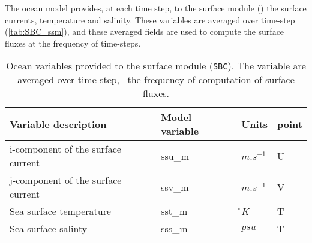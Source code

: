 \documentclass[../main/NEMO_manual]{subfiles}
\begin{document}

The ocean model provides, at each time step, to the surface module ()
the surface currents, temperature and salinity.
These variables are averaged over  time-step (\autoref{tab:SBC_ssm}), and
these averaged fields are used to compute the surface fluxes at the frequency of  time-steps.

\begin{table}[tb]
  \centering
  \begin{tabular}{|l|l|l|l|}
    \hline
    Variable description			                  & Model variable	& Units	& point                 \\
    \hline
    i-component of the surface current	& ssu\_m	              & $m.s^{-1}$	    & U     \\
    \hline
    j-component of the surface current	& ssv\_m	              & $m.s^{-1}$	    & V     \\
    \hline
    Sea surface temperature			         & sst\_m	              & \r{}$K$	             & T     \\\hline
    Sea surface salinty			                  & sss\_m	              & $psu$		        & T     \\	\hline
  \end{tabular}
  \caption[Ocean variables provided to the surface module)]{
    Ocean variables provided to the surface module (\texttt{SBC}).
    The variable are averaged over \protect{} time-step,
    \ie\ the frequency of computation of surface fluxes.}
  \label{tab:SBC_ssm}
\end{table}

\end{document}
